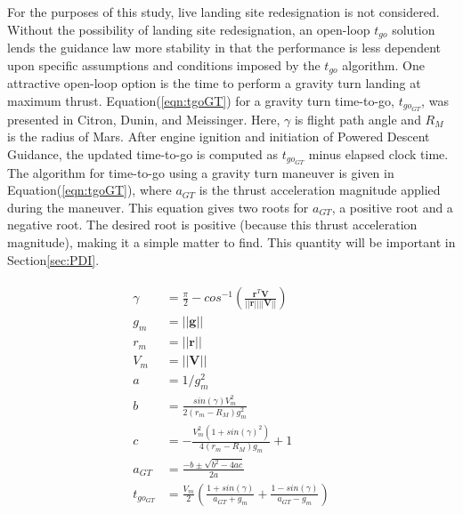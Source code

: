 For the purposes of this study, live landing site redesignation is not considered. Without the possibility of landing site redesignation, an open-loop $t_{go}$ solution lends the guidance law more stability in that the performance is less dependent upon specific assumptions and conditions imposed by the $t_{go}$ algorithm. One attractive open-loop option is the time to perform a gravity turn landing at maximum thrust. Equation\:(\ref{eqn:tgoGT}) for a gravity turn time-to-go, $t_{go_{GT}}$, was presented in Citron, Dunin, and Meissinger\:\cite{CITRON}. Here, $\gamma$ is flight path angle and $R_M$ is the radius of Mars. After engine ignition and initiation of Powered Descent Guidance, the updated time-to-go is computed as $t_{go_{GT}}$ minus elapsed clock time. The algorithm for time-to-go using a gravity turn maneuver is given in Equation\:(\ref{eqn:tgoGT}), where $a_{GT}$ is the thrust acceleration magnitude applied during the maneuver. This equation gives two roots for $a_{GT}$, a positive root and a negative root. The desired root is positive (because this thrust acceleration magnitude), making it a simple matter to find. This quantity will be important in Section\:\ref{sec:PDI}.

\begin{align}
\label{eqn:tgoGT}
\begin{split}
\gamma &= \frac{\pi}{2} - cos^{-1}\left(\frac{\bm{r}^T\bm{V}}{||\bm{r}||||\bm{V} ||} \right) \\
g_m &= ||\bm{g}|| \\
r_m &= ||\bm{r}|| \\
V_m &= ||\bm{V}|| \\
a &= 1/g_m^2 \\
b &= \frac{sin(\gamma)V_m^2}{2(r_m-R_M)g_m^2} \\
c &= -\frac{V_m^2 (1+sin(\gamma)^2)}{4(r_m - R_M)g_m}+1 \\
a_{GT} &= \frac{-b \pm \sqrt{b^2 - 4 a c}}{2 a} \\
t_{go_{GT}} &= \frac{V_m}{2} \left(\frac{1+sin(\gamma)}{a_{GT} + g_m} + \frac{1-sin(\gamma)}{a_{GT} - g_m} \right)
\end{split}
\end{align}

